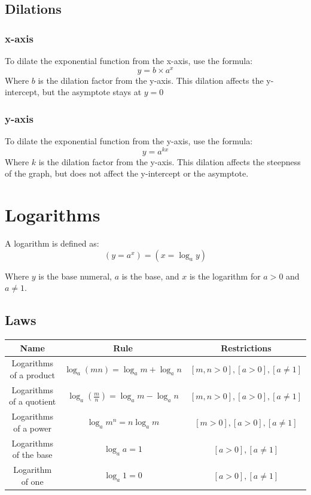 \documentclass{book}
\begin{document}
\section{Dilations}
\subsection{x-axis}
To dilate the exponential function from the x-axis, use the formula:
\[
	y = b \times a^x
\]
Where $b$ is the dilation factor from the y-axis.  This dilation affects the y-intercept, but the asymptote stays at $y = 0$\\

\subsection{y-axis}
To dilate the exponential function from the y-axis, use the formula:
\[
	y = a^{kx}
\]
Where $k$ is the dilation factor from the y-axis.  This dilation affects the steepness of the graph, but does not affect the y-intercept or the asymptote.

\chapter{Logarithms}
A logarithm is defined as:
\[
	(y = a^x) = (x = \log_ay)
\]
\begin{center}
\end{center}
Where $y$ is the base numeral, $a$ is the base, and $x$ is the logarithm for $a > 0$ and $a \not = 1$.

\section{Laws}
\begin{center}
	\begin{tabular}{c|c|c}
		Name                     & Rule                                      & Restrictions                        \\ \hline
		Logarithms of a product  & $\log_a(mn) = \log_am + \log_an$          & $[m, n > 0], [a > 0], [a \not = 1]$ \\
		Logarithms of a quotient & $\log_a(\frac{m}{n}) = \log_am - \log_an$ & $[m, n > 0], [a > 0], [a \not = 1]$ \\
		Logarithms of a power    & $\log_am^n = n\log_am$                    & $[m > 0], [a > 0], [a \not = 1]$    \\
		Logarithms of the base   & $\log_aa = 1$                             & $[a > 0], [a \not = 1]$             \\
		Logarithm of one         & $\log_a 1 = 0$                            & $[a > 0], [a \not = 1]$
	\end{tabular}
\end{center}
\end{document}
